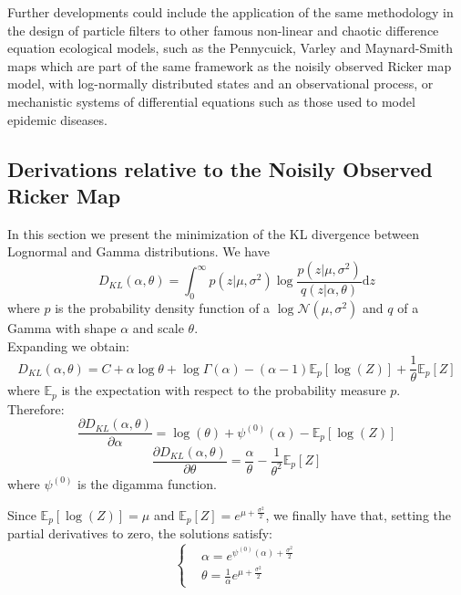 \documentclass[12pt]{article}
\begin{document}
	Further developments could include the application of the same methodology in the design of particle filters to other famous non-linear and chaotic difference equation ecological models, such as the Pennycuick, Varley and Maynard-Smith maps which are part of the same framework as the noisily observed Ricker map model, with log-normally distributed states and an observational process, or mechanistic systems of differential equations such as those used to model epidemic diseases. 
	
\clearpage

	
	{}
	
\clearpage
\begin{appendices}
	\section{Derivations relative to the Noisily Observed Ricker Map} \label{KLRicker}
	In this section we present the minimization of the KL divergence between Lognormal and Gamma distributions.
	We have
	\begin{equation*}
	D_{KL}(\alpha, \theta) = \int_{0}^{\infty}{p(z|\mu, \sigma^2)\log\frac{p(z|\mu, \sigma^2)}{q(z|\alpha, \theta)}\mathrm{d}z}
	\end{equation*}
	where $p$ is the probability density function of a $\log\mathcal{N}(\mu, \sigma^2)$ and $q$ of a Gamma with shape $\alpha$ and scale $\theta$. \\
	Expanding we obtain:
	\begin{equation*}
	D_{KL}(\alpha, \theta) = C + \alpha\log\theta + \log\Gamma(\alpha) - (\alpha-1)\mathbb{E}_p[\log(Z)] + \frac{1}{\theta}\mathbb{E}_p[Z]
	\end{equation*}
	where $\mathbb{E}_p$ is the expectation with respect to the probability measure $p$.\\
	Therefore:
	\begin{equation*}
	\frac{\partial D_{KL}(\alpha, \theta)}{\partial \alpha} = \log(\theta) + \psi^{(0)}(\alpha)-\mathbb{E}_p[\log(Z)]
	\end{equation*}
	\begin{equation*}
	\frac{\partial D_{KL}(\alpha, \theta)}{\partial \theta} = \frac{\alpha}{\theta} - \frac{1}{\theta^2}\mathbb{E}_p[Z]
	\end{equation*}
	where $\psi^{(0)}$ is the digamma function.
	
	Since $\mathbb{E}_p[\log(Z)]=\mu$ and $\mathbb{E}_p[Z] = e^{\mu+\frac{\sigma^2}{2}}$, we finally have that, setting the partial derivatives to zero, the solutions satisfy:
	\[	\begin{cases}
	& \alpha=e^{\psi^{(0)}(\alpha)+\frac{\sigma^2}{2}} \\
	& \theta=\frac{1}{\alpha}e^{\mu+\frac{\sigma^2}{2}}
	\end{cases}\]
	

\end{appendices}
\end{document}
